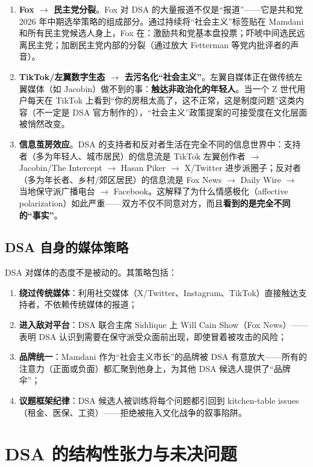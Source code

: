 \documentclass[12pt,a4paper]{ctexart}
\begin{document}
\begin{enumerate}
  \item \textbf{Fox $\rightarrow$ 民主党分裂}。Fox 对 DSA 的大量报道不仅是``报道''——它是共和党 2026 年中期选举策略的组成部分。通过持续将``社会主义''标签贴在 Mamdani 和所有民主党候选人身上，Fox 在：激励共和党基本盘投票；吓唬中间选民远离民主党；加剧民主党内部的分裂（通过放大 Fetterman 等党内批评者的声音）。
  \item \textbf{TikTok/左翼数字生态 $\rightarrow$ 去污名化``社会主义''}。左翼自媒体正在做传统左翼媒体（如 Jacobin）做不到的事：\textbf{触达非政治化的年轻人}。当一个 Z 世代用户每天在 TikTok 上看到``你的房租太高了，这不正常，这是制度问题''这类内容（不一定是 DSA 官方制作的），``社会主义''政策提案的可接受度在文化层面被悄然改变。
  \item \textbf{信息茧房效应}。DSA 的支持者和反对者生活在完全不同的信息世界中：支持者（多为年轻人、城市居民）的信息流是 TikTok 左翼创作者 $\rightarrow$ Jacobin/The Intercept $\rightarrow$ Hasan Piker $\rightarrow$ X/Twitter 进步派圈子；反对者（多为年长者、乡村/郊区居民）的信息流是 Fox News $\rightarrow$ Daily Wire $\rightarrow$ 当地保守派广播电台 $\rightarrow$ Facebook。这解释了为什么情感极化（affective polarization）如此严重——双方不仅不同意对方，而且\textbf{看到的是完全不同的``事实''}。
\end{enumerate}

\subsection{DSA 自身的媒体策略}

DSA 对媒体的态度不是被动的。其策略包括：

\begin{enumerate}
  \item \textbf{绕过传统媒体}：利用社交媒体（X/Twitter、Instagram、TikTok）直接触达支持者，不依赖传统媒体的报道；
  \item \textbf{进入敌对平台}：DSA 联合主席 Siddique 上 Will Cain Show（Fox News）——表明 DSA 认识到需要在保守派受众面前出现，即使冒着被攻击的风险；
  \item \textbf{品牌统一}：Mamdani 作为``社会主义市长''的品牌被 DSA 有意放大——所有的注意力（正面或负面）都汇聚到他身上，为其他 DSA 候选人提供了``品牌伞''；
  \item \textbf{议题框架纪律}：DSA 候选人被训练将每个问题都引回到 kitchen-table issues（租金、医保、工资）——拒绝被拖入文化战争的叙事陷阱。
\end{enumerate}

\section{DSA 的结构性张力与未决问题}
\end{document}
